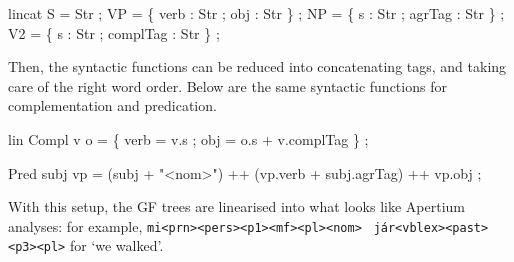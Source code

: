 \documentclass[10pt,a4paper]{article}
\newenvironment{Shaded}{\begin{snugshade}}{\end{snugshade}}
\newcommand{\DataTypeTok}[1]{\textcolor[rgb]{0.13,0.29,0.53}{{#1}}}
\newcommand{\StringTok}[1]{\textcolor[rgb]{0.31,0.60,0.02}{{#1}}}
\newcommand{\FunctionTok}[1]{\textcolor[rgb]{0.00,0.00,0.00}{{#1}}}
\newcommand{\NormalTok}[1]{{#1}}
\begin{document}
\begin{Shaded}
\begin{Highlighting}[]
  \NormalTok{lincat}
    \DataTypeTok{S}  \FunctionTok{=} \DataTypeTok{Str} \NormalTok{;}
    \DataTypeTok{VP} \FunctionTok{=} \NormalTok{\{ verb }\FunctionTok{:} \DataTypeTok{Str} \NormalTok{; obj }\FunctionTok{:} \DataTypeTok{Str} \NormalTok{\} ;}
    \DataTypeTok{NP} \FunctionTok{=} \NormalTok{\{ s }\FunctionTok{:} \DataTypeTok{Str} \NormalTok{; agrTag }\FunctionTok{:} \DataTypeTok{Str} \NormalTok{\} ;}
    \DataTypeTok{V2} \FunctionTok{=} \NormalTok{\{ s }\FunctionTok{:} \DataTypeTok{Str} \NormalTok{; complTag }\FunctionTok{:} \DataTypeTok{Str} \NormalTok{\} ;}
\end{Highlighting}
\end{Shaded}


Then, the syntactic functions can be reduced into concatenating tags,
and taking care of the right word order. Below are the same syntactic
functions for complementation and predication.


\begin{Shaded}
\begin{Highlighting}[]
  \NormalTok{lin }
    \DataTypeTok{Compl} \NormalTok{v o }\FunctionTok{=} \NormalTok{\{ verb }\FunctionTok{=} \NormalTok{v}\FunctionTok{.}\NormalTok{s ;}
                  \NormalTok{obj }\FunctionTok{=} \NormalTok{o}\FunctionTok{.}\NormalTok{s }\FunctionTok{+} \NormalTok{v}\FunctionTok{.}\NormalTok{complTag \} ;}

    \DataTypeTok{Pred} \NormalTok{subj vp }\FunctionTok{=} \NormalTok{(subj }\FunctionTok{+} \StringTok{"<nom>"}\NormalTok{)}
                \FunctionTok{++} \NormalTok{(vp}\FunctionTok{.}\NormalTok{verb }\FunctionTok{+} \NormalTok{subj}\FunctionTok{.}\NormalTok{agrTag)}
                \FunctionTok{++} \NormalTok{vp}\FunctionTok{.}\NormalTok{obj ;}
\end{Highlighting}
\end{Shaded}

With this setup, the GF trees are linearised into what looks like
Apertium analyses: for example,
\texttt{mi<prn><pers><p1><mf><pl><nom>} \texttt{ j\'{a}r<vblex><past><p3><pl>} for `we walked'.
\end{document}
